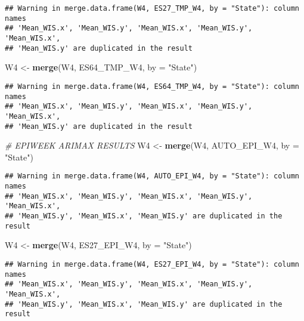 \documentclass[
]{article}
\newenvironment{Shaded}{\begin{snugshade}}{\end{snugshade}}
\newcommand{\AttributeTok}[1]{\textcolor[rgb]{0.13,0.29,0.53}{#1}}
\newcommand{\CommentTok}[1]{\textcolor[rgb]{0.56,0.35,0.01}{\textit{#1}}}
\newcommand{\FunctionTok}[1]{\textcolor[rgb]{0.13,0.29,0.53}{\textbf{#1}}}
\newcommand{\NormalTok}[1]{#1}
\newcommand{\OtherTok}[1]{\textcolor[rgb]{0.56,0.35,0.01}{#1}}
\newcommand{\StringTok}[1]{\textcolor[rgb]{0.31,0.60,0.02}{#1}}
\begin{document}
\begin{verbatim}
## Warning in merge.data.frame(W4, ES27_TMP_W4, by = "State"): column names
## 'Mean_WIS.x', 'Mean_WIS.y', 'Mean_WIS.x', 'Mean_WIS.y', 'Mean_WIS.x',
## 'Mean_WIS.y' are duplicated in the result
\end{verbatim}

\begin{Shaded}
\begin{Highlighting}[]
\NormalTok{W4 }\OtherTok{\textless{}{-}} \FunctionTok{merge}\NormalTok{(W4, ES64\_TMP\_W4, }\AttributeTok{by =} \StringTok{"State"}\NormalTok{)}
\end{Highlighting}
\end{Shaded}

\begin{verbatim}
## Warning in merge.data.frame(W4, ES64_TMP_W4, by = "State"): column names
## 'Mean_WIS.x', 'Mean_WIS.y', 'Mean_WIS.x', 'Mean_WIS.y', 'Mean_WIS.x',
## 'Mean_WIS.y' are duplicated in the result
\end{verbatim}

\begin{Shaded}
\begin{Highlighting}[]
\CommentTok{\# EPIWEEK ARIMAX RESULTS}
\NormalTok{W4 }\OtherTok{\textless{}{-}} \FunctionTok{merge}\NormalTok{(W4, AUTO\_EPI\_W4, }\AttributeTok{by =} \StringTok{"State"}\NormalTok{)}
\end{Highlighting}
\end{Shaded}

\begin{verbatim}
## Warning in merge.data.frame(W4, AUTO_EPI_W4, by = "State"): column names
## 'Mean_WIS.x', 'Mean_WIS.y', 'Mean_WIS.x', 'Mean_WIS.y', 'Mean_WIS.x',
## 'Mean_WIS.y', 'Mean_WIS.x', 'Mean_WIS.y' are duplicated in the result
\end{verbatim}

\begin{Shaded}
\begin{Highlighting}[]
\NormalTok{W4 }\OtherTok{\textless{}{-}} \FunctionTok{merge}\NormalTok{(W4, ES27\_EPI\_W4, }\AttributeTok{by =} \StringTok{"State"}\NormalTok{)}
\end{Highlighting}
\end{Shaded}

\begin{verbatim}
## Warning in merge.data.frame(W4, ES27_EPI_W4, by = "State"): column names
## 'Mean_WIS.x', 'Mean_WIS.y', 'Mean_WIS.x', 'Mean_WIS.y', 'Mean_WIS.x',
## 'Mean_WIS.y', 'Mean_WIS.x', 'Mean_WIS.y' are duplicated in the result
\end{verbatim}
\end{document}

